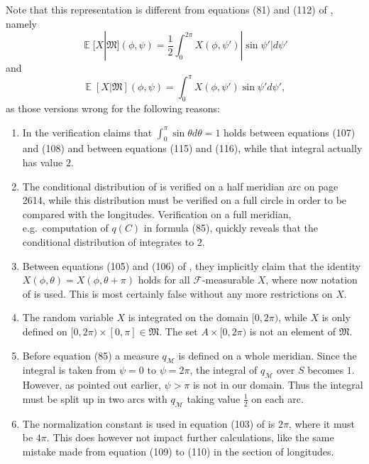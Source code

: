 \documentclass[twoside,a4paper]{report}
\theoremstyle{plain}
\theoremstyle{definition}
\theoremstyle{remark}
\numberwithin{equation}{chapter}
\DeclareMathOperator{\E}{\mathbb{E}}
\DeclareMathOperator{\1}{\mathbbm{1}}
\newcommand{\F}{\mathcal{F}}
\begin{document}
Note that this representation is different from equations (81) and (112) of \cite{Gyenis17}, namely
\begin{equation}
\E[X|\mathfrak{M}](\phi,\psi)=\frac{1}{2}\int_0^{2\pi}X(\phi,\psi')|\sin\psi'|d\psi'
\end{equation}
and 
\begin{equation}
\E[X|\mathfrak{M}](\phi,\psi)=\int_0^{\pi}X(\phi,\psi')\sin\psi'd\psi',
\end{equation}
as those versions wrong for the following reasons:
\begin{enumerate}
\item In the verification \cite{Gyenis17} claims that $\int_0^\pi\sin\theta d\theta=1$ holds between equations (107) and (108) and between equations (115) and (116), while that integral actually has value $2$.
\item The conditional distribution of \cite{Gyenis17} is verified on a half meridian arc on page 2614, while this distribution must be verified on a full circle in order to be compared with the longitudes. Verification on a full meridian, e.g.~computation of $q(C)$ in formula (85), quickly reveals that the conditional distribution of \cite{Gyenis17} integrates to $2$.
\item Between equations (105) and (106) of \cite{Gyenis17}, they implicitly claim that the identity $X(\phi,\theta)=X(\phi,\theta+\pi)$ holds for all $\F$-measurable $X$, where now notation of \cite{Gyenis17} is used. This is most certainly false without any more restrictions on $X$.
\item The random variable $X$ is integrated on the domain $[0,2\pi)$, while $X$ is only defined on $[0,2\pi)\times[0,\pi]\in\mathfrak{M}$. The set $A\times[0,2\pi)$ is not an element of $\mathfrak{M}$.
\item Before equation (85) a measure $q_\mathcal{M}$ is defined on a whole meridian. Since the integral is taken from $\psi=0$ to $\psi=2\pi$, the integral of $q_\mathcal{M}$ over $S$ becomes $1$. However, as pointed out earlier, $\psi>\pi$ is not in our domain. Thus the integral must be split up in two arcs with $q_{\mathcal{M}}$ taking value $\frac{1}{2}$ on each arc.
\item The normalization constant is used in equation (103) of \cite{Gyenis17} is $2\pi$, where it must be $4\pi$. This does however not impact further calculations, like the same mistake made from equation (109) to (110) in the section of longitudes.
\end{enumerate}
\end{document}
